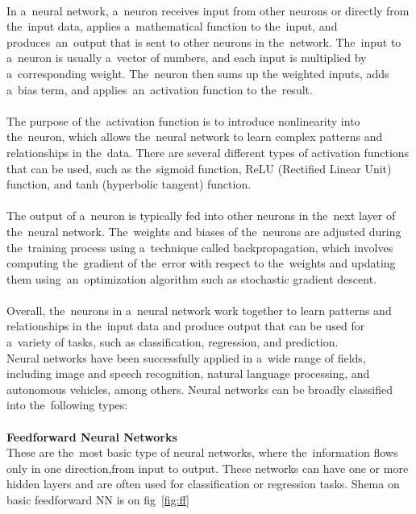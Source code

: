     \\
    In a~neural network, a~neuron receives input from other neurons or directly from the~input data, applies a~mathematical function to the~input, and produces~an~output that is sent to other neurons in the~network. The~input to a~neuron is usually a~vector of numbers, and each input is multiplied by a~corresponding weight. The~neuron then sums up the weighted inputs, adds a~bias term, and applies~an~activation function to the~result.\\
    \\
    The purpose of the~activation function is to introduce nonlinearity into the~neuron, which allows the~neural network to learn complex patterns and relationships in the~data. There are several different types of activation functions that can be used, such as the~sigmoid function, ReLU (Rectified Linear Unit) function, and tanh (hyperbolic tangent) function.\\
    \\
    The output of a~neuron is typically fed into other neurons in the~next layer of the~neural network. The~weights and biases of the~neurons are adjusted during the~training process using a~technique called backpropagation, which involves computing the~gradient of the~error with respect to the~weights and updating them using~an~optimization algorithm such as stochastic gradient descent.\\
    \\
    Overall, the~neurons in a~neural network work together to learn patterns and relationships in the~input data and produce output that can be used for a~variety of tasks, such as classification, regression, and prediction.\\
Neural networks have been successfully applied in a~wide range of fields, including image and speech recognition, natural language processing, and autonomous vehicles, among others. Neural networks can be broadly classified into the~following types:\\
    \\
    \textbf{Feedforward Neural Networks}\\
    These are the~most basic type of neural networks, where the~information flows only in one direction,from input to output. These networks can have one or more hidden layers and are often used for classification or regression tasks. Shema on basic feedforward NN is on fig~\ref{fig:ff}
